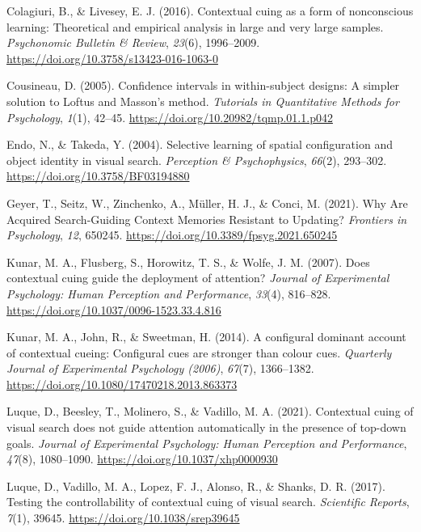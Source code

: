 \documentclass[
  man,floatsintext]{apa7}
\newlength{\cslhangindent}
\newlength{\cslentryspacingunit} %
\newenvironment{CSLReferences}[2] %
 {%
  \setlength{\parindent}{0pt}
  \ifodd #1
  \let\oldpar\par
  \def\par{\hangindent=\cslhangindent\oldpar}
  \fi
  \setlength{\parskip}{#2\cslentryspacingunit}
 }%
 {}
\begin{document}
\begin{CSLReferences}{1}{0}
\leavevmode{}%
Colagiuri, B., \& Livesey, E. J. (2016). Contextual cuing as a form of nonconscious learning: {Theoretical} and empirical analysis in large and very large samples. \emph{Psychonomic Bulletin \& Review}, \emph{23}(6), 1996--2009. \url{https://doi.org/10.3758/s13423-016-1063-0}

\leavevmode{}%
Cousineau, D. (2005). Confidence intervals in within-subject designs: {A} simpler solution to {Loftus} and {Masson}'s method. \emph{Tutorials in Quantitative Methods for Psychology}, \emph{1}(1), 42--45. \url{https://doi.org/10.20982/tqmp.01.1.p042}

\leavevmode{}%
Endo, N., \& Takeda, Y. (2004). Selective learning of spatial configuration and object identity in visual search. \emph{Perception \& Psychophysics}, \emph{66}(2), 293--302. \url{https://doi.org/10.3758/BF03194880}

\leavevmode{}%
Geyer, T., Seitz, W., Zinchenko, A., Müller, H. J., \& Conci, M. (2021). Why {Are Acquired Search-Guiding Context Memories Resistant} to {Updating}? \emph{Frontiers in Psychology}, \emph{12}, 650245. \url{https://doi.org/10.3389/fpsyg.2021.650245}

\leavevmode{}%
Kunar, M. A., Flusberg, S., Horowitz, T. S., \& Wolfe, J. M. (2007). Does contextual cuing guide the deployment of attention? \emph{Journal of Experimental Psychology: Human Perception and Performance}, \emph{33}(4), 816--828. \url{https://doi.org/10.1037/0096-1523.33.4.816}

\leavevmode{}%
Kunar, M. A., John, R., \& Sweetman, H. (2014). A configural dominant account of contextual cueing: {Configural} cues are stronger than colour cues. \emph{Quarterly Journal of Experimental Psychology (2006)}, \emph{67}(7), 1366--1382. \url{https://doi.org/10.1080/17470218.2013.863373}

\leavevmode{}%
Luque, D., Beesley, T., Molinero, S., \& Vadillo, M. A. (2021). Contextual cuing of visual search does not guide attention automatically in the presence of top-down goals. \emph{Journal of Experimental Psychology: Human Perception and Performance}, \emph{47}(8), 1080--1090. \url{https://doi.org/10.1037/xhp0000930}

\leavevmode{}%
Luque, D., Vadillo, M. A., Lopez, F. J., Alonso, R., \& Shanks, D. R. (2017). Testing the controllability of contextual cuing of visual search. \emph{Scientific Reports}, \emph{7}(1), 39645. \url{https://doi.org/10.1038/srep39645}


\end{CSLReferences}
\end{document}
